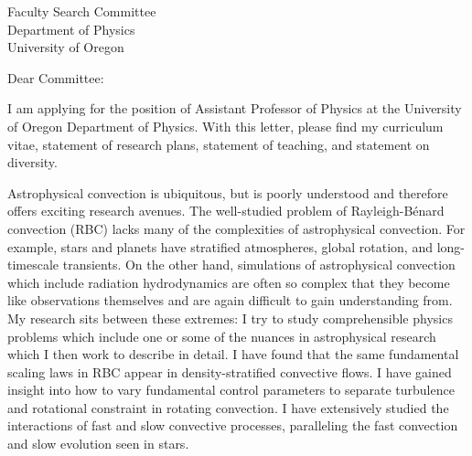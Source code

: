 \documentclass[11pt]{letter}
\begin{document}
\begin{letter}{
               Faculty Search Committee \\
               Department of Physics \\
               University of Oregon
           }

\opening{Dear Committee:}

    I am applying for the position of Assistant Professor of Physics at the University of Oregon Department of Physics.
    With this letter, please find my curriculum vitae, statement of research plans, statement of teaching, and statement on diversity.

    Astrophysical convection is ubiquitous, but is poorly understood and therefore offers exciting research avenues.
    The well-studied problem of Rayleigh-B\'{e}nard convection (RBC) lacks many of the complexities of astrophysical convection.
    For example, stars and planets have stratified atmospheres, global rotation, and long-timescale transients.
    On the other hand, simulations of astrophysical convection which include radiation hydrodynamics are often so complex that they become like observations themselves and are again difficult to gain understanding from.
    My research sits between these extremes: I try to study comprehensible physics problems which include one or some of the nuances in astrophysical research which I then work to describe in detail.
    I have found that the same fundamental scaling laws in RBC appear in density-stratified convective flows.
    I have gained insight into how to vary fundamental control parameters to separate turbulence and rotational constraint in rotating convection.
    I have extensively studied the interactions of fast and slow convective processes, paralleling the fast convection and slow evolution seen in stars.


\end{letter}
\end{document}
